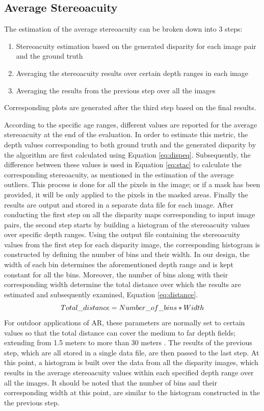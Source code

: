 \subsection{Average Stereoacuity}
The estimation of the average stereoacuity can be broken down into 3 steps:

\begin{enumerate}
\item Stereoacuity estimation based on the generated disparity for each image pair and the ground truth
\item Averaging the stereoacuity results over certain depth ranges in each image
\item Averaging the results from the previous step over all the images
\end{enumerate}
Corresponding plots are generated after the third step based on the final results.

According to the specific age ranges, different values are reported for the average stereoacuity
at the end of the evaluation. 
In order to estimate this metric, the depth values corresponding to both ground truth and the generated disparity by the algorithm are first
calculated using Equation \ref{eq:dispeq}. Subsequently, the difference between these values is used in Equation \ref{eq:stac} to calculate
the corresponding stereoacuity, as mentioned in the estimation of the average outliers. This process is done for all the pixels in the image; or if a mask has been provided, 
it will be only applied to the pixels in the masked areas. Finally the results are output and stored in a separate data file for each image.
After conducting the first step on all the disparity maps corresponding to input image pairs, the second step starts by building a histogram of
the stereoacuity values over specific depth ranges. Using the output file containing the stereoacuity values 
from the first step for each disparity image, the corresponding histogram is constructed by defining the number of bins and their width.
In our design, the width of each bin determines the aforementioned depth range and is kept constant for all the bins.
Moreover, the number of bins along with their corresponding width determine the total distance over which the results
are estimated and subsequently examined, Equation \ref{eq:distance}.
\begin{equation}
\label{eq:distance}
\centering
Total\_distance = Number\_of\_bins * Width
\end{equation}
For outdoor applications of AR, these parameters are normally set to certain values so that the total distance can cover the medium to far 
depth fields; extending from 1.5 meters to more than 30 meters \cite{swa07}.
The results of the previous step, which are all stored in a single data file, are then passed to the last step. 
At this point, a histogram is built over the data from all the disparity images, which results in the average stereoacuity
values within each specified depth range over all the images. 
It should be noted that the number of bins and their corresponding width at this point, are
similar to the histogram constructed in the the previous step.

